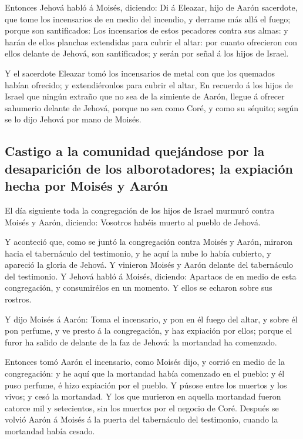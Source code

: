  Entonces Jehová habló á Moisés, diciendo:
 Di á Eleazar, hijo de Aarón sacerdote, que tome los
incensarios de en medio del incendio, y derrame más allá el fuego;
porque son santificados:  Los incensarios de estos
pecadores contra sus almas: y harán de ellos planchas extendidas para
cubrir el altar: por cuanto ofrecieron con ellos delante de Jehová, son
santificados; y serán por señal á los hijos de Israel.

 Y el sacerdote Eleazar tomó los incensarios de metal con
que los quemados habían ofrecido; y extendiéronlos para cubrir el altar,
 En recuerdo á los hijos de Israel que ningún extraño que
no sea de la simiente de Aarón, llegue á ofrecer sahumerio delante de
Jehová, porque no sea como Coré, y como su séquito; según se lo dijo
Jehová por mano de Moisés.

\hypertarget{castigo-a-la-comunidad-quejuxe1ndose-por-la-desapariciuxf3n-de-los-alborotadores-la-expiaciuxf3n-hecha-por-moisuxe9s-y-aaruxf3n}{%
\subsection{Castigo a la comunidad quejándose por la desaparición de los
alborotadores; la expiación hecha por Moisés y
Aarón}\label{castigo-a-la-comunidad-quejuxe1ndose-por-la-desapariciuxf3n-de-los-alborotadores-la-expiaciuxf3n-hecha-por-moisuxe9s-y-aaruxf3n}}

 El día siguiente toda la congregación de los hijos de
Israel murmuró contra Moisés y Aarón, diciendo: Vosotros habéis muerto
al pueblo de Jehová.

 Y aconteció que, como se juntó la congregación contra
Moisés y Aarón, miraron hacia el tabernáculo del testimonio, y he aquí
la nube lo había cubierto, y apareció la gloria de Jehová.
 Y vinieron Moisés y Aarón delante del tabernáculo del
testimonio.  Y Jehová habló á Moisés, diciendo:
 Apartaos de en medio de esta congregación, y
consumirélos en un momento. Y ellos se echaron sobre sus rostros.

 Y dijo Moisés á Aarón: Toma el incensario, y pon en él
fuego del altar, y sobre él pon perfume, y ve presto á la congregación,
y haz expiación por ellos; porque el furor ha salido de delante de la
faz de Jehová: la mortandad ha comenzado.

 Entonces tomó Aarón el incensario, como Moisés dijo, y
corrió en medio de la congregación: y he aquí que la mortandad había
comenzado en el pueblo: y él puso perfume, é hizo expiación por el
pueblo.  Y púsose entre los muertos y los vivos; y cesó
la mortandad.  Y los que murieron en aquella mortandad
fueron catorce mil y setecientos, sin los muertos por el negocio de
Coré.  Después se volvió Aarón á Moisés á la puerta del
tabernáculo del testimonio, cuando la mortandad había cesado.

